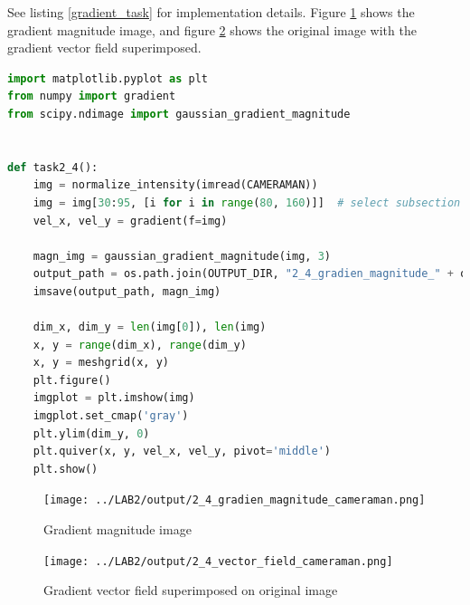 See listing \ref{gradient_task} for implementation details. Figure \ref{gradient_magnitude_image} shows the gradient magnitude image, and figure \ref{gradient_vector_field_image} shows the original image with the gradient vector field superimposed.

\begin{lstlisting}[language=Python, label=gradient_task, caption=Gradient]
import matplotlib.pyplot as plt
from numpy import gradient
from scipy.ndimage import gaussian_gradient_magnitude


def task2_4():
    img = normalize_intensity(imread(CAMERAMAN))
    img = img[30:95, [i for i in range(80, 160)]]  # select subsection of image
    vel_x, vel_y = gradient(f=img)

    magn_img = gaussian_gradient_magnitude(img, 3)
    output_path = os.path.join(OUTPUT_DIR, "2_4_gradien_magnitude_" + os.path.split(CAMERAMAN)[-1])
    imsave(output_path, magn_img)

    dim_x, dim_y = len(img[0]), len(img)
    x, y = range(dim_x), range(dim_y)
    x, y = meshgrid(x, y)
    plt.figure()
    imgplot = plt.imshow(img)
    imgplot.set_cmap('gray')
    plt.ylim(dim_y, 0)
    plt.quiver(x, y, vel_x, vel_y, pivot='middle')
    plt.show()
\end{lstlisting}

\begin{figure}[h!]
    \centering
    \texttt{[image: ../LAB2/output/2\_4\_gradien\_magnitude\_cameraman.png]}
    \caption{Gradient magnitude image}
    \label{gradient_magnitude_image}
\end{figure}

\begin{figure}[h!]
    \centering
    \texttt{[image: ../LAB2/output/2\_4\_vector\_field\_cameraman.png]}
    \caption{Gradient vector field superimposed on original image}
    \label{gradient_vector_field_image}
\end{figure}
